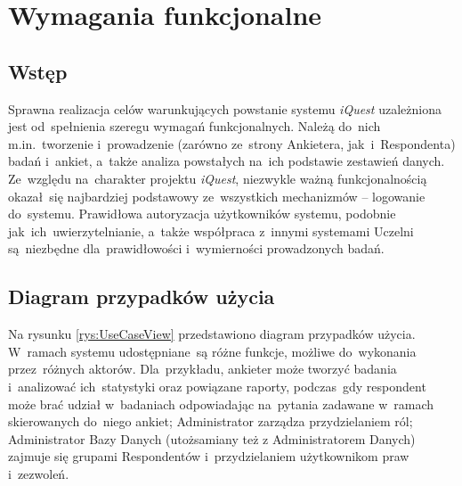 \chapter{Wymagania funkcjonalne}
\label{Chapter3}

\section{Wstęp}
\label{Chapter31}

Sprawna realizacja celów warunkujących powstanie systemu \textit{iQuest} uzależniona jest od~spełnienia szeregu wymagań funkcjonalnych. Należą do~nich m.in.~tworzenie i~prowadzenie (zarówno ze~strony Ankietera, jak~i~Respondenta) badań i~ankiet, a~także analiza powstałych na~ich podstawie zestawień danych. Ze~względu na~charakter projektu \textit{iQuest}, niezwykle ważną funkcjonalnością okazał~się najbardziej podstawowy ze~wszystkich mechanizmów -- logowanie do~systemu. Prawidłowa autoryzacja użytkowników systemu, podobnie jak~ich~uwierzytelnianie, a~także współpraca z~innymi systemami Uczelni są~niezbędne dla~prawidłowości i~wymierności prowadzonych badań.

\section{Diagram przypadków użycia}
\label{Chapter32}

Na rysunku \ref{rys:UseCaseView} przedstawiono diagram przypadków użycia. W~ramach systemu udostępniane~są różne funkcje, możliwe do~wykonania przez~różnych aktorów. Dla~przykładu, ankieter może tworzyć badania i~analizować ich~statystyki oraz powiązane raporty, podczas~gdy respondent może brać udział w~badaniach odpowiadając na~pytania zadawane w~ramach skierowanych do~niego ankiet; Administrator zarządza przydzielaniem ról; Administrator Bazy Danych (utożsamiany też z Administratorem Danych) zajmuje się grupami Respondentów i~przydzielaniem użytkownikom praw i~zezwoleń.

